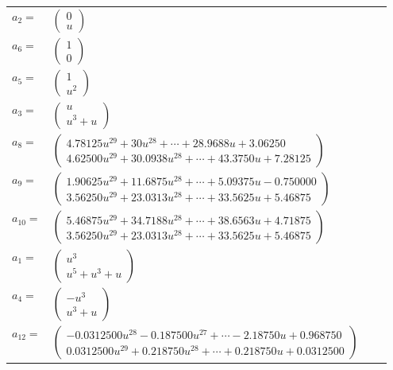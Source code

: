 \documentclass[1p]{elsarticle_modified}
\theoremstyle{definition}
\begin{document}
\begin{tabular}{m{7pt} m{180pt} m{7pt} m{180pt} }
\flushright $a_{2}=$&$\begin{pmatrix}0\\u\end{pmatrix}$ \\
\flushright $a_{6}=$&$\begin{pmatrix}1\\0\end{pmatrix}$ \\
\flushright $a_{5}=$&$\begin{pmatrix}1\\u^2\end{pmatrix}$ \\
\flushright $a_{3}=$&$\begin{pmatrix}u\\u^3+u\end{pmatrix}$ \\
\flushright $a_{8}=$&$\begin{pmatrix}4.78125 u^{29}+30 u^{28}+\cdots+28.9688 u+3.06250\\4.62500 u^{29}+30.0938 u^{28}+\cdots+43.3750 u+7.28125\end{pmatrix}$ \\
\flushright $a_{9}=$&$\begin{pmatrix}1.90625 u^{29}+11.6875 u^{28}+\cdots+5.09375 u-0.750000\\3.56250 u^{29}+23.0313 u^{28}+\cdots+33.5625 u+5.46875\end{pmatrix}$ \\
\flushright $a_{10}=$&$\begin{pmatrix}5.46875 u^{29}+34.7188 u^{28}+\cdots+38.6563 u+4.71875\\3.56250 u^{29}+23.0313 u^{28}+\cdots+33.5625 u+5.46875\end{pmatrix}$ \\
\flushright $a_{1}=$&$\begin{pmatrix}u^3\\u^5+u^3+u\end{pmatrix}$ \\
\flushright $a_{4}=$&$\begin{pmatrix}- u^3\\u^3+u\end{pmatrix}$ \\
\flushright $a_{12}=$&$\begin{pmatrix}-0.0312500 u^{28}-0.187500 u^{27}+\cdots-2.18750 u+0.968750\\0.0312500 u^{29}+0.218750 u^{28}+\cdots+0.218750 u+0.0312500\end{pmatrix}$ \\

\end{tabular}
\end{document}
